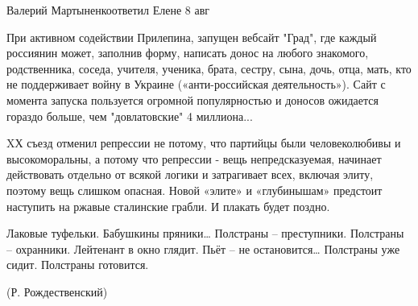 Валерий Мартыненкоответил Елене
8 авг

При активном содействии Прилепина, запущен вебсайт "Град", где каждый россиянин
может, заполнив форму, написать донос на любого знакомого, родственника,
соседа, учителя, ученика, брата, сестру, сына, дочь, отца, мать, кто не
поддерживает войну в Украине («анти-российская деятельность»). Сайт с момента
запуска пользуется огромной популярностью и доносов ожидается гораздо больше,
чем "довлатовские" 4 миллиона...

XХ съезд отменил репрессии не потому, что партийцы были человеколюбивы и
высокоморальны, а потому что репрессии - вещь непредсказуемая, начинает
действовать отдельно от всякой логики и затрагивает всех, включая элиту,
поэтому вещь слишком опасная. Новой «элите» и «глубинышам» предстоит наступить
на ржавые сталинские грабли. И плакать будет поздно. 

Лаковые туфельки. 
Бабушкины пряники… 
Полстраны – преступники. 
Полстраны – охранники. 
Лейтенант в окно глядит. 
Пьёт – не остановится… 
Полстраны уже сидит. 
Полстраны готовится. 

(Р. Рождественский)





